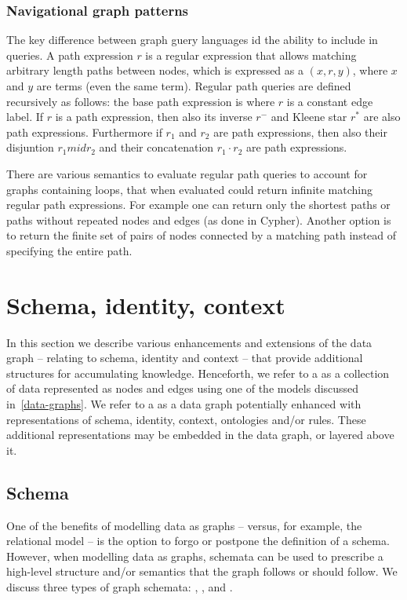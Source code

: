 \subsubsection{Navigational graph patterns}
The key difference between graph guery languages id the ability to include  in queries. A path expression $r$ is a regular expression that allows matching arbitrary length paths between nodes, which is expressed as a  $(x,r,y)$, where $x$ and $y$ are terms (even the same term). Regular path queries are defined recursively as follows: the base path expression is where $r$ is a constant edge label. If $r$ is a path expression, then also its inverse $r^-$ and Kleene star $r^*$ are also path expressions. Furthermore if $r_1$ and $r_2$ are path expressions, then also their disjuntion $r_1mid r_2$ and their concatenation $r_1\cdot r_2$ are path expressions.

There are various semantics to evaluate regular path queries to account for graphs containing loops, that when evaluated could return infinite matching regular path expressions. For example one can return only the shortest paths or paths without repeated nodes and edges (as done in Cypher). Another option is to return the finite set of pairs of nodes connected by a matching path instead of specifying the entire path.

\section{Schema, identity, context}\label{schema-identity-context}
In this section we describe various enhancements and extensions of the data graph – relating to schema, identity and context – that provide additional structures for accumulating knowledge. Henceforth, we refer to a  as a collection of data represented as nodes and edges using one of the models discussed in~\ref{data-graphs}. We refer to a  as a data graph potentially enhanced with representations of schema, identity, context, ontologies and/or rules. These additional representations may be embedded in the data graph, or layered above it.

\subsection{Schema}\label{schema}
One of the benefits of modelling data as graphs – versus, for example, the relational model – is the option to forgo or postpone the definition of a schema. However, when modelling data as graphs, schemata can be used to prescribe a high-level structure and/or semantics that the graph follows or should follow. We discuss three types of graph schemata: , , and .

